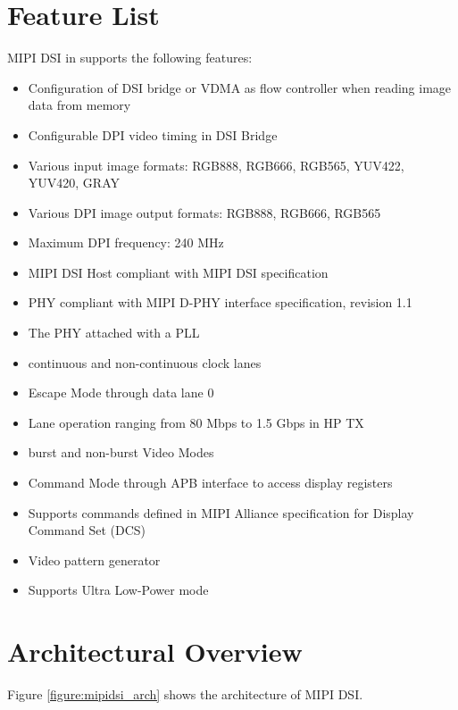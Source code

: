 \documentclass[main\_\_EN.tex]{subfiles}
\begin{document}




\section{Feature List}
\label{sec:mipidsi-features}

MIPI DSI in \chipname{} supports the following features:
\begin{itemize}
    \item Configuration of DSI bridge or VDMA as flow controller when reading image data from memory
    \item Configurable DPI video timing in DSI Bridge
    \item Various input image formats: RGB888, RGB666, RGB565, YUV422, YUV420, GRAY
    \item Various DPI image output formats: RGB888, RGB666, RGB565
    \item Maximum DPI frequency: 240 MHz
    \item MIPI DSI Host compliant with MIPI DSI specification
    \item PHY compliant with MIPI D-PHY interface specification, revision 1.1
    \item The PHY attached with a PLL
    \item continuous and non-continuous clock lanes
    \item Escape Mode through data lane 0
    \item Lane operation ranging from 80 Mbps to 1.5 Gbps in HP TX
    \item burst and non-burst Video Modes
    \item Command Mode through APB interface to access display registers
    \item Supports commands defined in MIPI Alliance specification for Display Command Set (DCS)
    \item Video pattern generator
    \item Supports Ultra Low-Power mode
\end{itemize}



\section{Architectural Overview}
\label{sec:mipidsi-arch-overview}
Figure \ref{figure:mipidsi_arch} shows the architecture of MIPI DSI.
\end{document}
